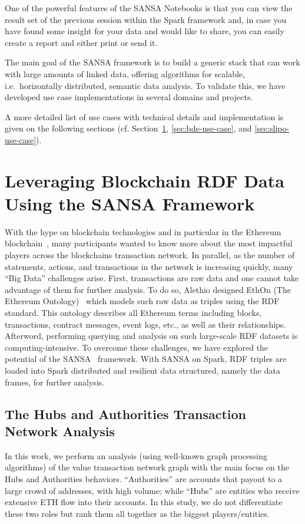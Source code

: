 One of the powerful features of the SANSA Notebooks is that you can view the result set of the previous session within the Spark framework and, in case you have found some insight for your data and would like to share, you can easily create a report and either print or send it.

The main goal of the SANSA framework is to build a generic stack that can work with large amounts of linked data, offering algorithms for scalable, i.e.~horizontally distributed, semantic data analysis.
To validate this, we have developed use case implementations in several domains and projects.
   
A more detailed list of use cases with technical details and implementation is given on the following sections (cf. Section~\ref{sec:alethio-use-case}, \ref{sec:bde-use-case}, and \ref{sec:slipo-use-case}).

\section{Leveraging Blockchain RDF Data Using the SANSA Framework}
\label{sec:alethio-use-case}
With the hype on blockchain technologies and in particular in the Ethereum blockchain~\cite{wood2014ethereum}, many participants wanted to know more about the most impactful players across the blockchains transaction network.
In parallel, as the number of statements, actions, and transactions in the network is increasing quickly, many ``Big Data'' challenges arise.
First, transactions are raw data and one cannot take advantage of them for further analysis.
To do so, Alethio designed EthOn (The Ethereum Ontology)~\cite{pfeffer2016ethon} which models such raw data as triples using the \gls{RDF} standard.
This ontology describes all Ethereum terms including blocks, transactions, contract messages, event logs, etc., as well as their relationships.
Afterword, performing querying and analysis on such large-scale \gls{RDF} datasets is computing-intensive.
To overcome these challenges, we have explored the potential of the SANSA~\cite{lehmann-2017-sansa-iswc} framework.
With SANSA on Spark, \gls{RDF} triples are loaded into Spark distributed and resilient data structured, namely the data frames, for further analysis.

\subsection{The Hubs and Authorities Transaction Network Analysis}
\label{sec:the-hub-and-authorities-use-case}
In this work, we perform an analysis (using well-known graph processing algorithms) of the value transaction network graph with the main focus on the Hubs and Authorities behaviors.
``Authorities'' are accounts that payout to a large crowd of addresses, with high volume; while ``Hubs'' are entities who receive extensive \gls{ETH} flow into their accounts.
In this study, we do not differentiate these two roles but rank them all together as the biggest players/entities.

